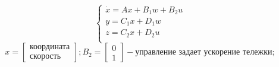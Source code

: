 \[
        \begin{cases}
                \dot{x} = A x + B_1 w + B_2 u \\
                y = C_1x + D_1 w  \\
                z = C_2x + D_2 u  \\
        \end{cases}
\]
\[x = \begin{bmatrix}
    \text{координата} \\ 
    \text{скорость}
  \end{bmatrix}; 
  B_2 = \begin{bmatrix}
    0 \\ 
    1
  \end{bmatrix} - \text{управление задает ускорение тележки};\]

\FloatBarrier